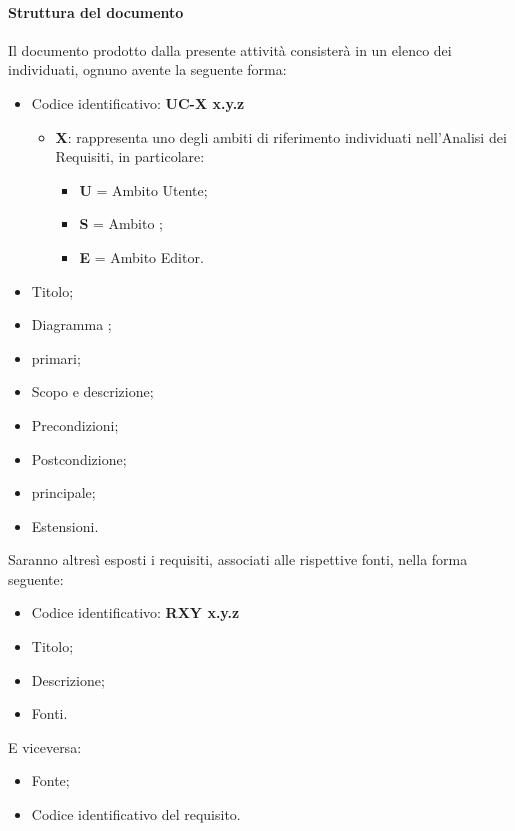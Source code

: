 			
			\paragraph*{Struttura del documento}
			Il documento prodotto dalla presente attivit\`a consister\`a in un elenco dei  individuati, 
                        ognuno avente la seguente forma:
				\begin{itemize}
				\item Codice identificativo: \textbf{UC-{X} x.y.z}
						\begin{itemize}
						\item \textbf{X}: rappresenta uno degli ambiti di riferimento individuati
						nell'Analisi dei Requisiti, in particolare:
							\begin{itemize}
							\item [] \textbf{U} = Ambito Utente;
							\item [] \textbf{S} = Ambito ;
							\item [] \textbf{E} = Ambito Editor. 
							\end{itemize}
						\end{itemize}
				\item Titolo;
				\item Diagramma ;
				\item {} primari;
				\item Scopo e descrizione;
				\item Precondizioni;
				\item Postcondizione;
				\item {} principale;
                                \item Estensioni.
				\end{itemize}
			Saranno altresì esposti i requisiti, associati alle rispettive fonti, nella forma seguente:
				\begin{itemize}
				\item Codice identificativo: \textbf{R{X}{Y} x.y.z}
				\item Titolo;
				\item Descrizione;
                \item Fonti.
				\end{itemize}
			E viceversa:
				\begin{itemize}
				\item Fonte;
				\item Codice identificativo del requisito.
				\end{itemize}

